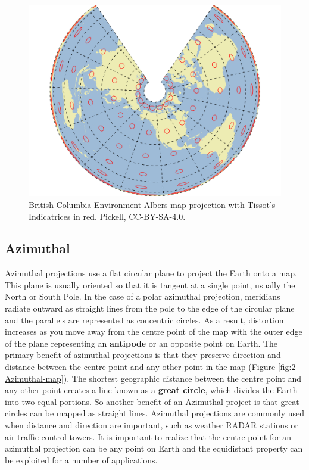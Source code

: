 \documentclass[
]{book}
\begin{document}
\begin{figure}
\includegraphics[width=0.75\linewidth]{images/02-BC-Albers-map} \caption{British Columbia Environment Albers map projection with Tissot's Indicatrices in red. Pickell, CC-BY-SA-4.0.}\label{fig:2-BC-Albers-map}
\end{figure}

\subsection{Azimuthal}\label{azimuthal}

Azimuthal projections use a flat circular plane to project the Earth onto a map. This plane is usually oriented so that it is tangent at a single point, usually the North or South Pole. In the case of a polar azimuthal projection, meridians radiate outward as straight lines from the pole to the edge of the circular plane and the parallels are represented as concentric circles. As a result, distortion increases as you move away from the centre point of the map with the outer edge of the plane representing an \textbf{antipode} or an opposite point on Earth. The primary benefit of azimuthal projections is that they preserve direction and distance between the centre point and any other point in the map (Figure \ref{fig:2-Azimuthal-map}). The shortest geographic distance between the centre point and any other point creates a line known as a \textbf{great circle}, which divides the Earth into two equal portions. So another benefit of an Azimuthal project is that great circles can be mapped as straight lines. Azimuthal projections are commonly used when distance and direction are important, such as weather RADAR stations or air traffic control towers. It is important to realize that the centre point for an azimuthal projection can be any point on Earth and the equidistant property can be exploited for a number of applications.
\end{document}

